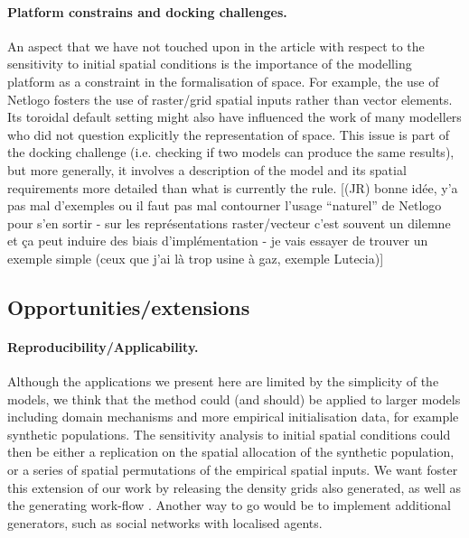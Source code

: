 \documentclass[Royal,sageh,times]{sagej}
\begin{document}
\paragraph{Platform constrains and docking challenges.} An aspect that we have not touched upon in the article with respect to the sensitivity to initial spatial conditions is the importance of the modelling platform as a constraint in the formalisation of space. For example, the use of Netlogo fosters the use of raster/grid spatial inputs rather than vector elements. Its toroidal default setting might also have influenced the work of many modellers who did not question explicitly the representation of space. This issue is part of the docking challenge \citep{Axtelletal1996} (i.e. checking if two models can produce the same results), but more generally, it involves a description of the model and its spatial requirements more detailed than what is currently the rule. [(JR) bonne idée, y'a pas mal d'exemples ou il faut pas mal contourner l'usage ``naturel'' de Netlogo pour s'en sortir - sur les représentations raster/vecteur c'est souvent un dilemne et ça peut induire des biais d'implémentation - je vais essayer de trouver un exemple simple (ceux que j'ai là trop usine à gaz, exemple Lutecia)]

\subsection{Opportunities/extensions}


\paragraph{Reproducibility/Applicability.} 
Although the applications we present here are limited by the simplicity of the models, we think that the method could (and should) be applied to larger models including domain mechanisms and more empirical initialisation data, for example synthetic populations. The sensitivity analysis to initial spatial conditions could then be either a replication on the spatial allocation of the synthetic population, or a series of spatial permutations of the empirical spatial inputs.
We want foster this extension of our work by releasing the density grids also generated, as well as the generating work-flow . Another way to go would be to implement additional generators, such as social networks \citep{alizadeh2016generating} with localised agents. 
\end{document}
